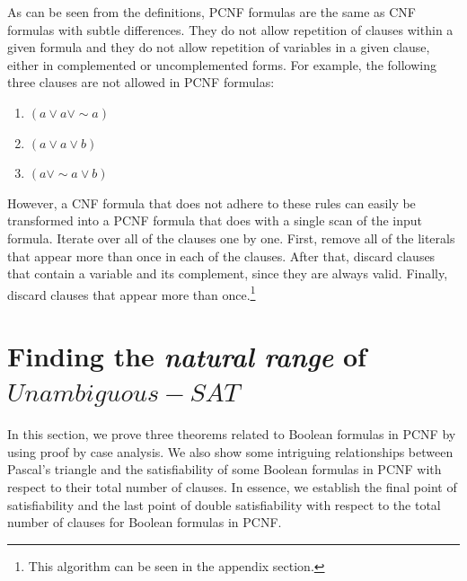\documentclass[runningheads,a4paper]{llncs}
\let\oldsim\sim
\renewcommand{\sim}{{\oldsim}}
\begin{document}
As can be seen from the definitions, PCNF formulas are the same as CNF formulas with subtle differences. They do not allow repetition of clauses within a given formula and they do not allow repetition of variables in a given clause, either in complemented or uncomplemented forms. For example, the following three clauses are not allowed in PCNF formulas: 
\begin{enumerate}
\item $({a}\vee {a}\vee \sim {a})$ 
\item $({a} \vee {a} \vee {b})$
\item $({a} \vee \sim{a} \vee {b})$
\end{enumerate}

However, a CNF formula that does not adhere to these rules can easily be transformed into a PCNF formula that does with a single scan of the input formula. Iterate over all of the clauses one by one. First, remove all of the literals that appear more than once in each of the clauses. After that, discard clauses that contain a variable and its complement, since they are always valid. Finally, discard clauses that appear more than once.\footnote{This algorithm can be seen in the appendix section.}

\section{Finding the \emph{natural range} of ${Unambiguous-SAT}$}

In this section, we prove three theorems related to Boolean formulas in PCNF by using proof by case analysis. We also show some intriguing relationships between Pascal's triangle and the satisfiability of some Boolean formulas in PCNF with respect to their total number of clauses. In essence, we establish the final point of satisfiability and the last point of double satisfiability with respect to the total number of clauses for Boolean formulas in PCNF. 
\end{document}

